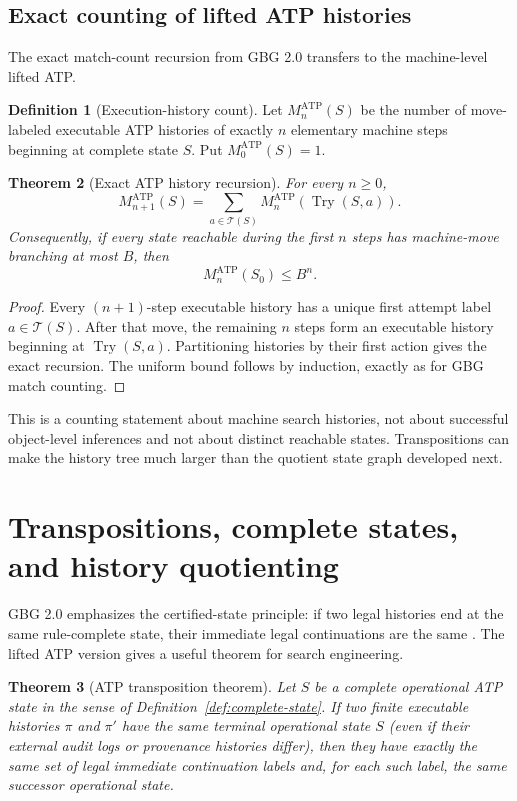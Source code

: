 \documentclass[11pt]{article}
\newtheorem{theorem}{Theorem}[section]
\theoremstyle{definition}
\newtheorem{definition}[theorem]{Definition}
\newcommand{\Try}{\operatorname{Try}}
\begin{document}
\subsection{Exact counting of lifted ATP histories}

The exact match-count recursion from GBG 2.0 transfers to the machine-level lifted ATP.

\begin{definition}[Execution-history count]
Let $M_n^{\mathrm{ATP}}(S)$ be the number of move-labeled executable ATP histories of exactly $n$ elementary machine steps beginning at complete state $S$. Put $M_0^{\mathrm{ATP}}(S)=1$.
\end{definition}

\begin{theorem}[Exact ATP history recursion]\label{thm:atp-history-recursion}
For every $n\ge 0$,
\[
M_{n+1}^{\mathrm{ATP}}(S)
=
\sum_{a\in\mathcal T(S)}
M_n^{\mathrm{ATP}}(\Try(S,a)).
\]
Consequently, if every state reachable during the first $n$ steps has machine-move branching at most $B$, then
\[
M_n^{\mathrm{ATP}}(S_0)\le B^n.
\]
\end{theorem}

\begin{proof}
Every $(n+1)$-step executable history has a unique first attempt label $a\in\mathcal T(S)$. After that move, the remaining $n$ steps form an executable history beginning at $\Try(S,a)$. Partitioning histories by their first action gives the exact recursion. The uniform bound follows by induction, exactly as for GBG match counting.
\end{proof}

This is a counting statement about machine search histories, not about successful object-level inferences and not about distinct reachable states. Transpositions can make the history tree much larger than the quotient state graph developed next.

\section{Transpositions, complete states, and history quotienting}

GBG 2.0 emphasizes the certified-state principle: if two legal histories end at the same rule-complete state, their immediate legal continuations are the same \cite{TennesonGBG20}. The lifted ATP version gives a useful theorem for search engineering.

\begin{theorem}[ATP transposition theorem]\label{thm:transposition}
Let $S$ be a complete operational ATP state in the sense of Definition~\ref{def:complete-state}. If two finite executable histories $\pi$ and $\pi'$ have the same terminal operational state $S$ (even if their external audit logs or provenance histories differ), then they have exactly the same set of legal immediate continuation labels and, for each such label, the same successor operational state.
\end{theorem}
\end{document}
